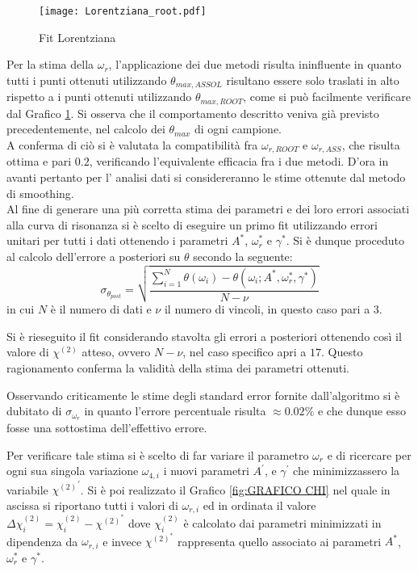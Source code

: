 \documentclass[a4paper,11pt,oneside]{article}
\begin{document}
\begin{figure}[h!]
    \centering
    \texttt{[image: Lorentziana\_root.pdf]}
    \caption{Fit Lorentziana}
    \label{fig:lorentziana_root}
\end{figure}

Per la stima della $\omega_{r}$, l'applicazione dei due metodi risulta ininfluente in quanto tutti i punti ottenuti utilizzando  $\theta_ {max, ASSOL}$ risultano essere solo traslati in alto rispetto a i punti ottenuti utilizzando  $\theta_{max, ROOT}$, come si può facilmente verificare dal Grafico \ref{fig:lorentziana_root}. Si osserva che il comportamento descritto veniva già previsto precedentemente, nel calcolo dei $\theta_{max}$ di ogni campione.\\
A conferma di ciò si è valutata la compatibilità fra $\omega_{r, ROOT}$ e $\omega_{r, ASS}$, che risulta ottima e pari $0.2$, verificando l'equivalente efficacia fra i due metodi. 
D'ora in avanti pertanto per l' analisi dati si considereranno le stime ottenute dal metodo di smoothing.\\

Al fine di generare una più corretta stima dei parametri e dei loro errori associati alla curva di risonanza si è scelto di eseguire un primo fit utilizzando errori unitari per tutti i dati ottenendo i parametri $A^{\ast}$, $\omega_{r}^{\ast}$ e $\gamma^{\ast}$. Si è dunque proceduto al calcolo dell'errore a posteriori su $\theta$ secondo la seguente:
\begin{equation*}
    \sigma_{\theta_{post}}=\sqrt{\frac{\sum_{i=1}^{N} \theta(\omega_{i})-\theta(\omega_{i} ; A^{\ast}, \omega_{r}^{\ast}, \gamma^{\ast})}{N-\nu}}
\end{equation*}
in cui $N$ è il numero di dati e $\nu$ il numero di vincoli, in questo caso pari a $3$.

Si è rieseguito il fit considerando stavolta gli errori a posteriori ottenendo così il valore di $\chi^{(2)}$ atteso, ovvero $N-\nu$, nel caso specifico apri a $17$. Questo ragionamento conferma la validità della stima dei parametri ottenuti. 

Osservando criticamente le stime degli standard error fornite dall'algoritmo si è dubitato di $\sigma_{\omega_{r}}$ in quanto l'errore percentuale risulta $\approx 0.02 \%$ e che dunque esso fosse una sottostima dell'effettivo errore.

Per verificare tale stima si è scelto di far variare il parametro $\omega_r$ e di ricercare per ogni sua singola variazione $\omega_{4, i}$ i nuovi parametri $A^{'}$, e $\gamma^{'}$ che minimizzassero la variabile ${\chi^{(2)}}^{'}$. Si è poi realizzato il Grafico \ref{fig:GRAFICO CHI} nel quale in ascissa si riportano tutti i valori di $\omega_{r, i}$ ed in ordinata il valore $\Delta\chi^{(2)}_{i}=\chi^{(2)}_{i}-\chi^{(2)}^{\ast}$ dove $\chi^{(2)}_{i}$ è calcolato dai parametri minimizzati in dipendenza da $\omega_{r, i}$ e invece  $\chi^{(2)}^{\ast}$  rappresenta quello associato ai parametri $A^{\ast}$, $\omega_{r}^{\ast}$ e $\gamma^{\ast}$.
\end{document}

